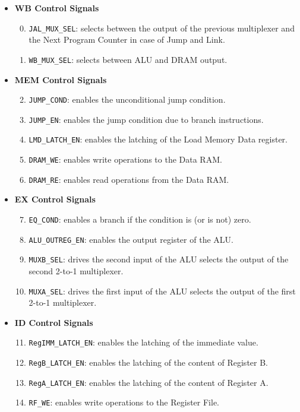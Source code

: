 \begin{itemize}%

	\item \textbf{WB Control Signals}
	\begin{enumerate}
            \setcounter{enumi}{-1}
		\item \texttt{JAL\_MUX\_SEL}: selects between the output of the previous multiplexer and the Next Program Counter in case of Jump and Link.
		\item \texttt{WB\_MUX\_SEL}: selects between ALU and DRAM output.
	\end{enumerate}

	\item \textbf{MEM Control Signals}
	\begin{enumerate}
		\setcounter{enumi}{1}
		\item \texttt{JUMP\_COND}: enables the unconditional jump condition.
		\item \texttt{JUMP\_EN}: enables the jump condition due to branch instructions.
		\item \texttt{LMD\_LATCH\_EN}: enables the latching of the Load Memory Data register.
		\item \texttt{DRAM\_WE}: enables write operations to the Data RAM.
		\item \texttt{DRAM\_RE}: enables read operations from the Data RAM.
	\end{enumerate}

	\item \textbf{EX Control Signals}
	\begin{enumerate}
		\setcounter{enumi}{6}
		\item \texttt{EQ\_COND}: enables a branch if the condition is (or is not) zero.
		\item \texttt{ALU\_OUTREG\_EN}: enables the output register of the ALU.
		\item \texttt{MUXB\_SEL}: drives the second input of the ALU selects the output of the second 2-to-1 multiplexer.
		\item \texttt{MUXA\_SEL}: drives the first input of the ALU selects the output of the first 2-to-1 multiplexer.
	\end{enumerate}

	\item \textbf{ID Control Signals}
	\begin{enumerate}
		\setcounter{enumi}{10}
		\item \texttt{RegIMM\_LATCH\_EN}: enables the latching of the immediate value.
		\item \texttt{RegB\_LATCH\_EN}: enables the latching of the content of Register B.
		\item \texttt{RegA\_LATCH\_EN}: enables the latching of the content of Register A.
		\item \texttt{RF\_WE}: enables write operations to the Register File.
	\end{enumerate}


\end{itemize}
